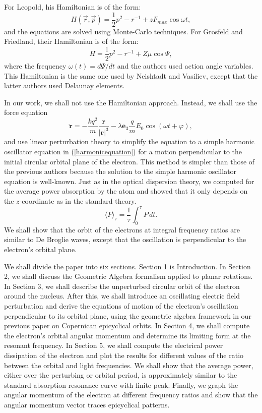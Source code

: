 \documentclass[twocolumn,showpacs,preprintnumbers,amsmath,amssymb]{revtex4}
\begin{document}
For Leopold, his Hamiltonian is of the form:
\begin{equation}
H(\vec{r}, \vec{p}) = \frac{1}{2}p^2 -r^{-1} + zF_{max}\cos\omega t,
\end{equation}
and the equations are solved using Monte-Carlo techniques. For Grosfeld and Friedland, their Hamiltonian is of the form: 
\begin{equation}
H = \frac{1}{2}p^2 -r^{-1} + Z\mu\cos\Psi,
\end{equation}
where the frequency $\omega (t) = d\Psi/dt$ and the authors used action angle variables. This Hamiltonian is the same one used by Neishtadt and Vasiliev, except that the latter authors used Delaunay elements. 
 
In our work, we shall not use the Hamiltonian approach. Instead, we shall use the force equation 
\begin{equation}
\label{eq:ddot r is -qE_Coul - qE_pert expand}
\ddot{\mathbf r} = -\frac{kq^2}{m}\frac{\mathbf r}{|\mathbf r|^3} - \lambda\mathbf e_3\frac{q}{m}E_0\cos(\omega t + \varphi), 
\end{equation}
and use linear perturbation theory to simplify the equation to a simple harmonic oscillator equation in (\ref{harmonicequation}) for a motion perpendicular to the initial circular orbital plane of the electron. This method is simpler than those of the previous authors because the solution to the simple harmonic oscillator equation is well-known. Just as in the optical dispersion theory, we computed for the average power absorption by the atom and showed that it only depends on the $z$-coordinate as in the standard theory. \begin{equation}
\langle P\rangle_\tau = \frac{1}{\tau}\int_0^{\tau}P\,dt .
\end{equation}
We shall show that the orbit of the electrons at integral frequency ratios are similar to De Broglie waves, except that the oscillation is perpendicular to the electron's orbital plane.
 
We shall divide the paper into six sections. Section 1 is Introduction. In Section 2, we shall discuss the Geometric Algebra formalism applied to planar rotations. In Section 3, we shall describe the unperturbed circular orbit of the electron around the nucleus. After this, we shall introduce an oscillating electric field perturbation and derive the equations of motion of the electron's oscillation perpendicular to its orbital plane, using the geometric algebra framework in our previous paper on Copernican epicyclical orbits\cite{sugoncopernican}. 
In Section 4, we shall compute the electron's orbital angular momentum and determine its limiting form at the resonant frequency. In Section 5, we shall compute the electrical power dissipation of the electron and plot the results for different values of the ratio between the orbital and light frequencies. We shall show that the average power, either over the perturbing or orbital period, is approximately similar to the standard absorption resonance curve with finite peak. Finally, we graph the angular momentum of the electron at different frequency ratios and show that the angular momentum vector traces epicyclical patterns. 
\end{document}
